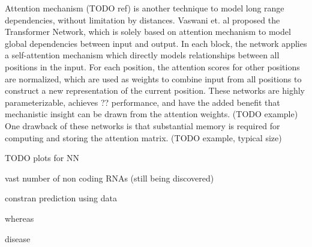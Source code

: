 \documentclass{proposal}
\begin{document}
Attention mechanism (TODO ref) is another technique to model long range dependencies,
without limitation by distances.
Vaswani et. al\cite{vaswani2017attention} proposed the Transformer Network,
which is solely based on attention mechanism to model global dependencies between input and output.
In each block, the network applies a self-attention mechanism
which directly models relationships between all positions in the input.
For each position, the attention scores for other positions are normalized,
which are used as weights to combine input from all positions to construct a new representation of the current position.
These networks are highly parameterizable, achieves ?? performance,
and have the added benefit that mechanistic insight can be drawn from the attention weights. (TODO example)
One drawback of these networks is that substantial memory is required for computing and storing the attention matrix.
(TODO example, typical size)


TODO plots for NN


vast number of non coding RNAs (still being discovered)

constran prediction using data

whereas

disease

%
%
%
%
%
%
%
%
%
%
%
%
%
%





%
%
%
%
%
%
%
\end{document}
